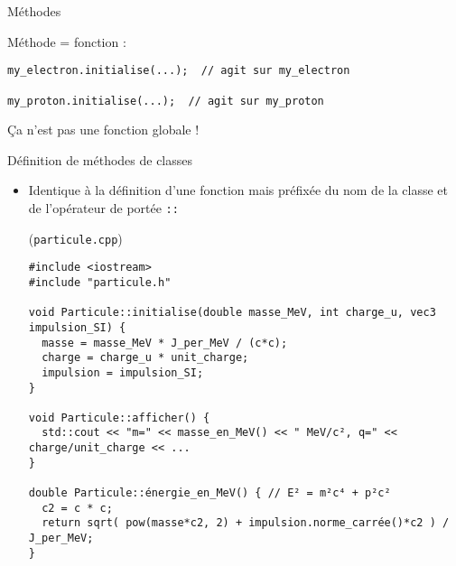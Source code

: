 \documentclass[c]{beamer}
\begin{document}

\begin{frame}[fragile]{Méthodes}

Méthode = fonction  :\\

\begin{verbatim}
my_electron.initialise(...);  // agit sur my_electron

my_proton.initialise(...);  // agit sur my_proton
\end{verbatim}
\vspace{1em}
\pause
Ça n'est pas une fonction globale !

\end{frame}


\begin{frame}[fragile]{Définition de méthodes de classes}

\begin{itemize}
\item Identique à la définition d'une fonction mais préfixée du nom de la classe et
de l'opérateur de portée \texttt{::}
\begin{cbox}[][lwuc](\texttt{particule.cpp})
\begin{verbatim}
#include <iostream>
#include "particule.h"

void Particule::initialise(double masse_MeV, int charge_u, vec3 impulsion_SI) {
  masse = masse_MeV * J_per_MeV / (c*c);
  charge = charge_u * unit_charge;
  impulsion = impulsion_SI;
}

void Particule::afficher() {
  std::cout << "m=" << masse_en_MeV() << " MeV/c², q=" << charge/unit_charge << ...
}

double Particule::énergie_en_MeV() { // E² = m²c⁴ + p²c²
  c2 = c * c;
  return sqrt( pow(masse*c2, 2) + impulsion.norme_carrée()*c2 ) / J_per_MeV;
}
\end{verbatim}
\end{cbox}
\end{itemize}

\end{frame}

\end{document}
